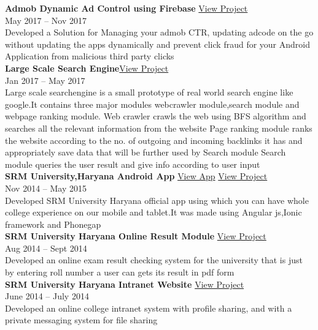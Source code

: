 \documentclass[margin,line]{res}
\begin{document}
\begin{resume}
{\bf Admob Dynamic Ad Control using Firebase} \hfill \href{https://github.com/sagunesh/Admob-Ad-Control}{View Project}\\{May 2017 -- Nov 2017}\\
Developed a Solution for Managing your admob CTR, updating adcode on the go without updating the apps dynamically and prevent click fraud for your Android Application from malicious third party clicks\\

{\bf Large Scale Search Engine}\hfill \href{https://github.com/sagunesh/Large-Scale-Search-Engine}{View Project}\\{Jan 2017 -- May 2017}\\
Large scale searchengine is a small prototype of real world search engine like google.It contains three major modules 
webcrawler module,search module and webpage ranking module.
Web crawler crawls the web using BFS algorithm and searches all the relevant information  from the website 
Page ranking module ranks the website according to the no. of outgoing and incoming backlinks it has and appropriately save data that will be further used by Search module
Search module queries the user result and give info according to user input\\

{\bf SRM University,Haryana Android App} \hfill \href{https://play.google.com/store/apps/details?id=com.SRM_University_Haryana.officialapp&hl=en}{View App} \href{https://github.com/sagunesh/SRM-University-Android-App}{View Project} \\{Nov 2014 -- May 2015}\\
Developed SRM University Haryana official app using which you can have whole college experience on our mobile and tablet.It was made using Angular js,Ionic framework and Phonegap\\

{\bf SRM University Haryana Online Result Module} \hfill \href{https://github.com/sagunesh/SRM-University-Management-System/tree/master/online-result-module}{View Project}\\{Aug 2014 -- Sept 2014}\\
Developed an online exam result checking system for the university that is  just by entering roll number a user can gets its result in pdf form\\

{\bf SRM University Haryana Intranet Website} \hfill \href{https://github.com/sagunesh/SRM-University-Management-System}{View Project}\\{June 2014 -- July 2014}\\
Developed an online college intranet system  with profile sharing, and with a private messaging system for file sharing \\


\end{resume}
\end{document}
